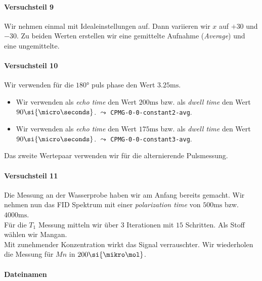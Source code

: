 \documentclass{subfiles}
\begin{document}
        \paragraph*{Versuchsteil 9}
            Wir nehmen einmal mit Idealeinstellungen auf. Dann variieren wir $x$ auf $+30$ und $-30$. Zu beiden Werten erstellen wir eine gemittelte Aufnahme (\emph{Average}) und eine ungemittelte.


        \paragraph*{Versuchsteil 10}
            Wir verwenden für die $180\si{\degree}$ puls phase den Wert $3.25\si{\ms}$. 
            \begin{itemize}
                \item Wir verwenden als \emph{echo time} den Wert $200\si{\ms}$ bzw. als \emph{dwell time} den Wert $90\si{\micro\seconds}$. $\leadsto$ \texttt{CPMG-0-0-constant2-avg}.
                \item Wir verwenden als \emph{echo time} den Wert $175\si{\ms}$ bzw. als \emph{dwell time} den Wert $90\si{\micro\seconds}$. $\leadsto$ \texttt{CPMG-0-0-constant3-avg}.
            \end{itemize}
            Das zweite Wertepaar verwenden wir für die alternierende Pulsmessung. 

        \paragraph*{Versuchsteil 11}
            Die Messung an der Wasserprobe haben wir am Anfang bereits gemacht. Wir nehmen nun das FID Spektrum mit einer \emph{polarization time} von $500\si{\ms}$ bzw. $4000\si{\ms}$. \\

            Für die $T_1$ Messung mitteln wir über $3$ Iterationen mit $15$ Schritten. Als Stoff wählen wir Mangan. \\

            Mit zunehmender Konzentration wirkt das Signal verrauschter. Wir wiederholen die Messung für $Mn$ in $200\si{\mikro\mol}$. 


        \paragraph*{Dateinamen}
\end{document}
